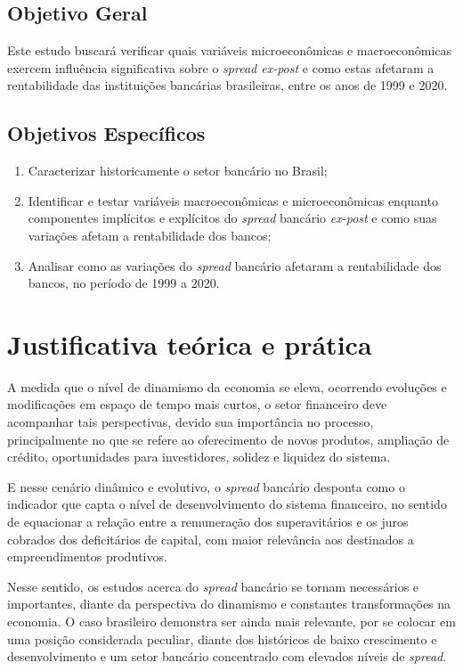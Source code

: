 \documentclass[12pt,12pt,openright,oneside,a4paper,chapter=TITLE,section=TITLE,subsection=TITLE,subsubsection=TITLE,english,french,spanish,portugues,sumario=tradicional]{abntex2}
\providecommand{\tightlist}{%
  \setlength{\itemsep}{0pt}\setlength{\parskip}{0pt}}
\begin{document}
\subsection{Objetivo Geral}

Este estudo buscará verificar quais variáveis microeconômicas e macroeconômicas exercem influência significativa sobre o \emph{spread ex-post} e como estas afetaram a rentabilidade das instituições bancárias brasileiras, entre os anos de 1999 e 2020.

\subsection{Objetivos Específicos}

\begin{enumerate}
\def\labelenumi{\arabic{enumi}.}
\tightlist
\item
  Caracterizar historicamente o setor bancário no Brasil;
\item
  Identificar e testar variáveis macroeconômicas e microeconômicas enquanto componentes implícitos e explícitos do \emph{spread} bancário \emph{ex-post} e como suas variações afetam a rentabilidade dos bancos;
\item
  Analisar como as variações do \emph{spread} bancário afetaram a rentabilidade dos bancos, no período de 1999 a 2020.
\end{enumerate}

\section{Justificativa teórica e prática}

A medida que o nível de dinamismo da economia se eleva, ocorrendo evoluções e modificações em espaço de tempo mais curtos, o setor financeiro deve acompanhar tais perspectivas, devido sua importância no processo, principalmente no que se refere ao oferecimento de novos produtos, ampliação de crédito, oportunidades para investidores, solidez e liquidez do sistema.

E nesse cenário dinâmico e evolutivo, o \emph{spread} bancário desponta como o indicador que capta o nível de desenvolvimento do sistema financeiro, no sentido de equacionar a relação entre a remuneração dos superavitários e os juros cobrados dos deficitários de capital, com maior relevância aos destinados a empreendimentos produtivos.

Nesse sentido, os estudos acerca do \emph{spread} bancário se tornam necessários e importantes, diante da perspectiva do dinamismo e constantes transformações na economia. O caso brasileiro demonstra ser ainda mais relevante, por se colocar em uma posição considerada peculiar, diante dos históricos de baixo crescimento e desenvolvimento e um setor bancário concentrado com elevados níveis de \emph{spread}.
\end{document}
